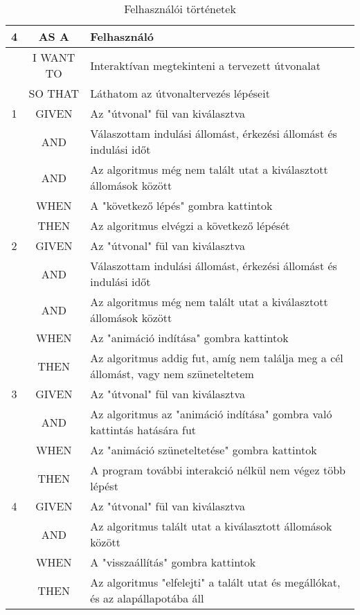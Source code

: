 \begin{table}[H]
    \centering
    \begin{tabular}{|c|c|p{10cm}|}
        \hline
        \textbf{4}
        & AS A          & Felhasználó \\ \hline
        & I WANT TO     & Interaktívan megtekinteni a tervezett útvonalat \\ \hline
        & SO THAT       & Láthatom az útvonaltervezés lépéseit \\ \hline
        \hline
        1 & GIVEN   & Az "útvonal" fül van kiválasztva \\ \hline
        & AND     & Válaszottam indulási állomást, érkezési állomást és indulási időt \\ \hline
        & AND     & Az algoritmus még nem talált utat a kiválasztott állomások között \\ \hline
        & WHEN    & A "következő lépés" gombra kattintok \\ \hline
        & THEN    & Az algoritmus elvégzi a következő lépését \\ \hline
        \hline
        2 & GIVEN   & Az "útvonal" fül van kiválasztva \\ \hline
        & AND     & Válaszottam indulási állomást, érkezési állomást és indulási időt \\ \hline
        & AND     & Az algoritmus még nem talált utat a kiválasztott állomások között \\ \hline
        & WHEN    & Az "animáció indítása" gombra kattintok \\ \hline
        & THEN    & Az algoritmus addig fut, amíg nem találja meg a cél állomást, vagy nem szüneteltetem \\ \hline
        \hline
        3 & GIVEN   & Az "útvonal" fül van kiválasztva \\ \hline
        & AND     & Az algoritmus az "animáció indítása" gombra való kattintás hatására fut \\ \hline
        & WHEN    & Az "animáció szüneteltetése" gombra kattintok \\ \hline
        & THEN    & A program további interakció nélkül nem végez több lépést \\ \hline
        \hline
        4 & GIVEN   & Az "útvonal" fül van kiválasztva \\ \hline
        & AND     & Az algoritmus talált utat a kiválasztott állomások között \\ \hline
        & WHEN    & A "visszaállítás" gombra kattintok \\ \hline
        & THEN    & Az algoritmus "elfelejti" a talált utat és megállókat, és az alapállapotába áll \\ \hline
    \end{tabular}
    \caption{Felhasználói történetek}
    \label{tab:user-stories-control}
\end{table}

